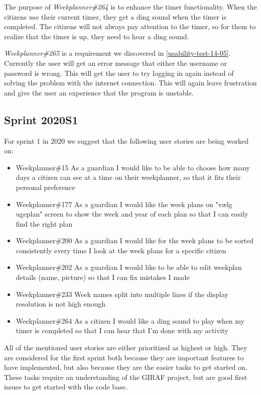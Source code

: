 The purpose of \textit{Weekplanner\#264} is to enhance the timer functionality.
When the citizens use their current timer, they get a ding sound when the timer is completed.
The citizens will not always pay attention to the timer, so for them to realize that the timer is up, they need to hear a ding sound.

\textit{Weekplanner\#265} is a requirement we discovered in \autoref{usability-test-14-05}. 
Currently the user will get an error message that either the username or password is wrong. 
This will get the user to try logging in again instead of solving the problem with the internet connection.
This will again leave frustration and give the user an experience that the program is unstable.

\subsection{Sprint 2020S1}
For sprint 1 in 2020 we suggest that the following user stories are being worked on:

\begin{itemize}
    \item Weekplanner\#15 As a guardian I would like to be able to choose how many days a citizen can see at a time on their weekplanner, so that it fits their personal preference 
    \item Weekplanner\#177 As a guardian I would like the week plans on "vælg ugeplan" screen to show the week and year of each plan so that I can easily find the right plan 
    \item Weekplanner\#200 As a guardian I would like for the week plans to be sorted consistently every time I look at the week plans for a specific citizen
    \item Weekplanner\#202 As a guardian I would like to be able to edit weekplan details (name, picture) so that I can fix mistakes I made
    \item Weekplanner\#233 Week names split into multiple lines if the display resolution is not high enough 
    \item Weekplanner\#264 As a citizen I would like a ding sound to play when my timer is completed so that I can hear that I'm done with my activity
\end{itemize}
\noindent
All of the mentioned user stories are either prioritized as highest or high. 
They are considered for the first sprint both because they are important features to have implemented, but also because they are the easier tasks to get started on.
These tasks require an understanding of the GIRAF project, but are good first issues to get started with the code base.
